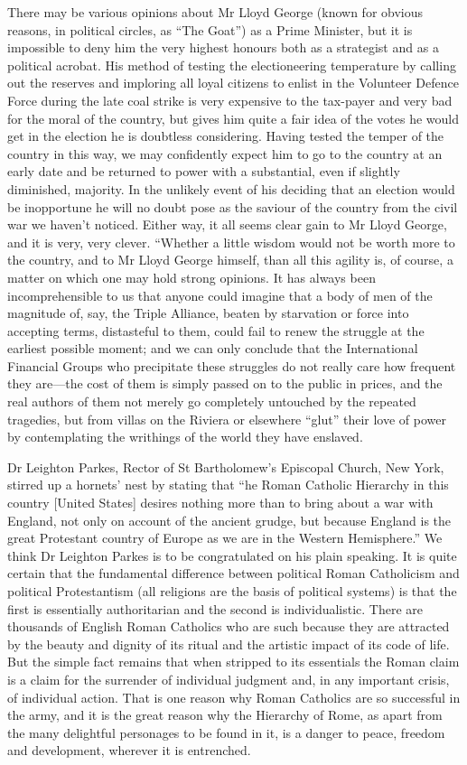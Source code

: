 \documentclass{book}
\begin{document}
There may be various opinions about Mr Lloyd George (known for obvious reasons, in political circles, as “The Goat”) as a Prime Minister, but it is impossible to deny him the very highest honours both as a strategist and as a political acrobat. His method of testing the electioneering temperature by calling out the reserves and imploring all loyal citizens to enlist in the Volunteer Defence Force during the late coal strike is very expensive to the tax-payer and very bad for the moral of the country, but gives him quite a fair idea of the votes he would get in the election he is doubtless considering. Having tested the temper of the country in this way, we may confidently expect him to go to the country at an early date and be returned to power with a substantial, even if slightly diminished, majority. In the unlikely event of his deciding that an election would be inopportune he will no doubt pose as the saviour of the country from the civil war we haven’t noticed. Either way, it all seems clear gain to Mr Lloyd George, and it is very, very clever. “Whether a little wisdom would not be worth more to the country, and to Mr Lloyd George himself, than all this agility is, of course, a matter on which one may hold strong opinions. It has always been incomprehensible to us that anyone could imagine that a body of men of the magnitude of, say, the Triple Alliance, beaten by starvation or force into accepting terms, distasteful to them, could fail to renew the struggle at the earliest possible moment; and we can only conclude that the International Financial Groups who precipitate these struggles do not really care how frequent they are—the cost of them is simply passed on to the public in prices, and the real authors of them not merely go completely untouched by the repeated tragedies, but from villas on the Riviera or elsewhere “glut” their love of power by contemplating the writhings of the world they have enslaved.

Dr Leighton Parkes, Rector of St Bartholomew’s Episcopal Church, New York, stirred up a hornets’ nest by stating that “he Roman Catholic Hierarchy in this country {[}United States{]} desires nothing more than to bring about a war with England, not only on account of the ancient grudge, but because England is the great Protestant country of Europe as we are in the Western Hemisphere.” We think Dr Leighton Parkes is to be congratulated on his plain speaking. It is quite certain that the fundamental difference between political Roman Catholicism and political Protestantism (all religions are the basis of political systems) is that the first is essentially authoritarian and the second is individualistic. There are thousands of English Roman Catholics who are such because they are attracted by the beauty and dignity of its ritual and the artistic impact of its code of life. But the simple fact remains that when stripped to its essentials the Roman claim is a claim for the surrender of individual judgment and, in any important crisis, of individual action. That is one reason why Roman Catholics are so successful in the army, and it is the great reason why the Hierarchy of Rome, as apart from the many delightful personages to be found in it, is a danger to peace, freedom and development, wherever it is entrenched.
\end{document}

